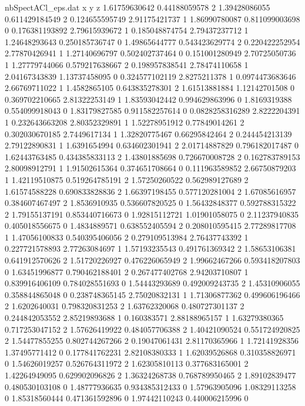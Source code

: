 \begin{filecontents}{nbSpectACl_eps.dat}
x y z
1.61759630642 0.44188059578 2
1.39428086055 0.611429184549 2
0.124655595749 2.91175421737 1
1.86990780087 0.811099003698 0
0.176381193892 2.79615939672 1
0.185048874754 2.79437237712 1
1.24648293643 0.250185736747 0
1.49865644777 0.543423629774 2
0.220422252954 2.77870426941 1
1.27140696797 0.502402737464 0
0.151001280949 2.70725050736 1
1.27779744066 0.579217638667 2
0.198957838541 2.78474110658 1
2.04167343839 1.13737458095 0
0.324577102119 2.8275211378 1
0.0974473683646 2.66769711022 1
1.4582865105 0.643835278301 2
1.61513881884 1.12142701508 0
0.369702210665 2.81322253149 1
1.83593042442 0.994629863996 0
1.8169319388 0.554099918043 0
1.83179827585 0.911582257614 0
0.0828258316289 2.8222204391 1
0.232643663208 2.80352329891 1
1.52278951912 0.77849014261 2
0.302030670185 2.7449617134 1
1.32820775467 0.66295842464 2
0.244454213139 2.79122890831 1
1.6391654994 0.634602301941 2
2.01714887829 0.796182017487 0
1.62443763485 0.434385833113 2
1.43801885698 0.726670008728 2
0.162783789153 2.80098912791 1
1.91502615364 0.374651708664 0
0.111963589852 2.66750879203 1
1.42119510875 0.519264785191 2
1.57250260522 0.562989127689 2
1.61574588228 0.690833828836 2
1.66397198455 0.577120281004 2
1.67085616957 0.384607467497 2
1.8536910935 0.536607820525 0
1.56432848377 0.592788315322 2
1.79155137191 0.853440716673 0
1.92815112721 1.01901058075 0
2.11237940835 0.405018556675 0
1.4834889571 0.638552405594 2
0.208010595415 2.77289817708 1
1.47056100833 0.540395406056 2
0.279109513984 2.76437743392 1
0.227721578893 2.77263084697 1
1.57193235543 0.491761369342 2
1.58653106381 0.641912570626 2
1.51720226927 0.476226065949 2
1.99662467266 0.593418207803 0
1.63451996877 0.790462188401 2
0.267477402768 2.94203710807 1
0.839916406109 0.784028551693 0
1.54443293689 0.492009243735 2
1.45310906055 0.358844865048 0
0.238748365145 2.75020832131 1
1.71306877362 0.499606196466 2
1.6202640031 0.798320831253 2
1.63762320068 0.480727301137 2
0.244842053552 2.85219893688 1
0.160383571 2.88188965157 1
1.63279380365 0.717253047152 2
1.57626419922 0.484057706388 2
1.40421090524 0.551724920825 2
1.54477855255 0.802744267266 2
0.19047061431 2.81170365966 1
1.72141928356 1.37495771412 0
0.177841762231 2.82108380333 1
1.62039526868 0.310358826971 0
1.54626019257 0.526764311972 2
1.62305810113 0.377683165001 2
1.42264949095 0.629902096826 2
1.36324268738 0.768789950465 2
1.89102839477 0.480530103108 0
1.48777936635 0.934385312433 0
1.57963905096 1.08329113258 0
1.85318560444 0.471361592896 0
1.97442110243 0.440006215996 0

\end{filecontents}
